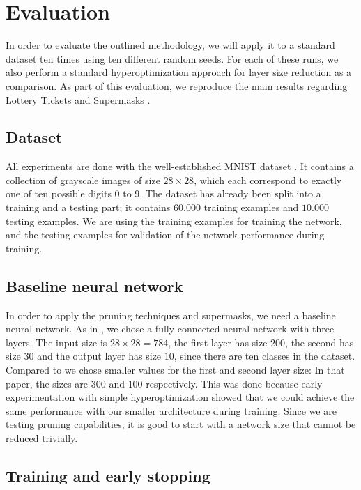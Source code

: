 \documentclass[12pt,final,twoside]{article}
\theoremstyle{plain}
\theoremstyle{definition}
\theoremstyle{remark}
\theoremstyle{named}
\begin{document}
\section{Evaluation}
In order to evaluate the outlined methodology, we will apply it to a standard dataset ten times using ten different random seeds. For each of these runs, we also perform a standard hyperoptimization approach for layer size reduction as a comparison. As part of this evaluation, we reproduce the main results regarding Lottery Tickets \cite{lottery} and Supermasks \cite{supermask}.

\subsection{Dataset}

All experiments are done with the well-established MNIST dataset \cite{mnist}. It contains a collection of grayscale images of size $28 \times 28$, which each correspond to exactly one of ten possible digits $0$ to $9$. The dataset has already been split into a training and a testing part; it contains $60.000$ training examples and $10.000$ testing examples. We are using the training examples for training the network, and the testing examples for validation of the network performance during training.

\subsection{Baseline neural network}

In order to apply the pruning techniques and supermasks, we need a baseline neural network. As in \cite{supermask}, we chose a fully connected neural network with three layers. The input size is $28 \times 28 = 784$, the first layer has size $200$, the second has size $30$ and the output layer has size $10$, since there are ten classes in the dataset. Compared to \cite{supermask} we chose smaller values for the first and second layer size: In that paper, the sizes are $300$ and $100$ respectively. This was done because early experimentation with simple hyperoptimization showed that we could achieve the same performance with our smaller architecture during training. Since we are testing pruning capabilities, it is good to start with a network size that cannot be reduced trivially.


\subsection{Training and early stopping}
\end{document}
